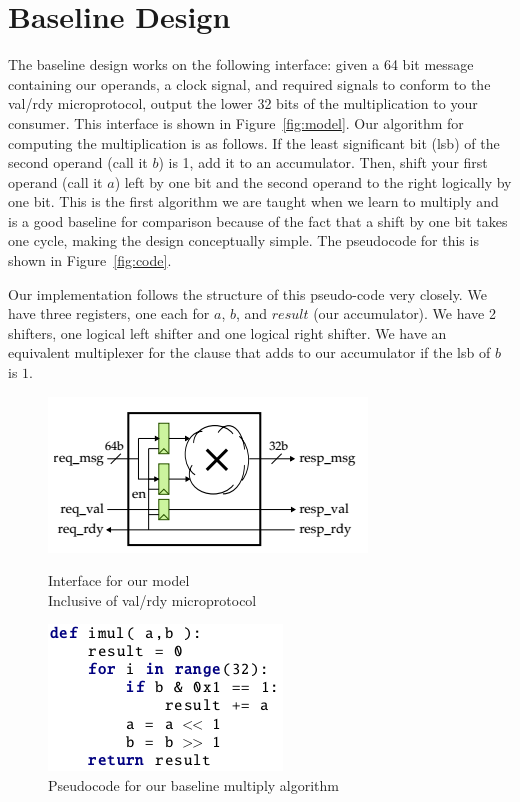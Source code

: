 \documentclass[10pt]{article}
\begin{document}
\section{Baseline Design}

The baseline design works on the following interface: 
given a 64 bit message containing our operands, a clock signal,
and required signals to conform to the val/rdy microprotocol,
output the lower 32 bits of the multiplication to your consumer.
This interface is shown in Figure~\ref{fig:model}.
Our algorithm for computing the multiplication is as follows.
If the least significant bit (lsb) of the second operand (call it $b$) is 1, add it to an accumulator.
Then, shift your first operand (call it $a$) left by one bit and the second operand to the right logically by one bit.
This is the first algorithm we are taught when we learn to multiply and is a good baseline for comparison because of the fact that a shift by one bit takes one cycle, making the design conceptually simple.
The pseudocode for this is shown in Figure~\ref{fig:code}. 

Our implementation follows the structure of this pseudo-code very closely.
We have three registers, one each for $a$, $b$, and $result$ (our accumulator).
We have 2 shifters, one logical left shifter and one logical right shifter. 
We have an equivalent multiplexer for the clause that adds to our accumulator if the lsb of $b$ is $1$.

\begin{figure}[b]
    \centering
    \begin{minipage}{.5\textwidth}
        \includegraphics[scale=0.6]{FLmodel} %
        \caption{Interface for our model\\
        Inclusive of val/rdy microprotocol}
        \label{fig:model}
   \end{minipage}%
\begin{minipage}{.5\textwidth}
    \centering
    \includegraphics[scale=0.55]{imul}
    \caption{Pseudocode for our baseline multiply algorithm}
    \label{fig:code}
    \end{minipage}
\label{fig:test}
\end{figure}
\end{document}
